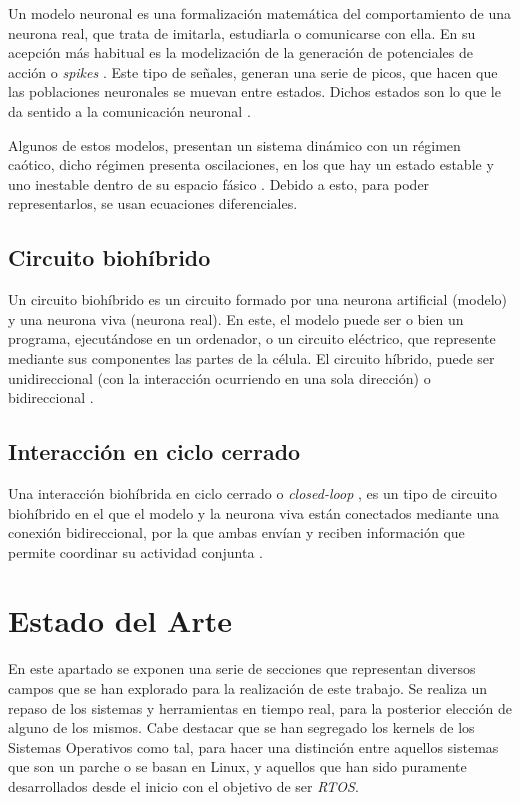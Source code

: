 Un modelo neuronal es una formalización matemática del comportamiento de una neurona real, que trata de imitarla, estudiarla o comunicarse con ella. En su acepción más habitual es la modelización de la generación de potenciales de acción o \textit{spikes} \cite{Fortuna2023}. Este tipo de señales, generan una serie de picos, que hacen que las poblaciones neuronales se muevan entre estados. Dichos estados son lo que le da sentido a la comunicación neuronal \cite{Rabinovich2008}.

Algunos de estos modelos, presentan un sistema dinámico con un régimen caótico, dicho régimen presenta oscilaciones, en los que hay un estado estable y uno inestable dentro de su espacio fásico \cite{Rulkov2002}. Debido a esto, para poder representarlos, se usan ecuaciones diferenciales.


\subsection{Circuito biohíbrido\label{SS:CIRCUITOBIOHIBRIDO}}

Un circuito biohíbrido es un circuito formado por una neurona artificial (modelo) y una neurona viva (neurona real). En este, el modelo puede ser o bien un programa, ejecutándose en un ordenador, o un circuito eléctrico, que represente mediante sus componentes las partes de la célula. El circuito híbrido, puede ser unidireccional (con la interacción ocurriendo en una sola dirección) o bidireccional \cite{ReyesSnchez2023}.


\subsection{Interacción en ciclo cerrado\label{SS:CICLOCERRADO}}

Una interacción biohíbrida en ciclo cerrado o \textit{closed-loop} \cite{Varona2016a}, es un tipo de circuito biohíbrido en el que el modelo y la neurona viva están conectados mediante una conexión bidireccional, por la que ambas envían y reciben información que permite coordinar su actividad conjunta \cite{Amaducci2022}.


\section{Estado del Arte\label{SEC:ESTADODELARTE}}


En este apartado se exponen una serie de secciones que representan diversos campos que se han explorado para la realización de este trabajo. Se realiza un repaso de los sistemas y herramientas en tiempo real, para la posterior elección de alguno de los mismos. Cabe destacar que se han segregado los kernels de los Sistemas Operativos como tal, para hacer una distinción entre aquellos sistemas que son un parche o se basan en Linux, y aquellos que han sido puramente desarrollados desde el inicio con el objetivo de ser \textit{RTOS}.


